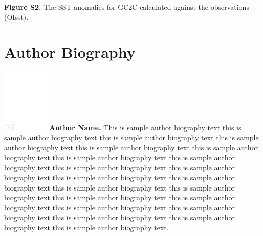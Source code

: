 \documentclass[AMA,STIX1COL]{WileyNJD-v2}
\begin{document}
\noindent
\textbf{Figure S2.}
{The SST anomalies for GC2C calculated against the observations (OIsst).}





%

\clearpage

\section*{Author Biography}

\begin{biography}{\includegraphics[width=66pt,height=86pt,draft]{empty}}{\textbf{Author Name.} This is sample author biography text this is sample author biography text this is sample author biography text this is sample author biography text this is sample author biography text this is sample author biography text this is sample author biography text this is sample author biography text this is sample author biography text this is sample author biography text this is sample author biography text this is sample author biography text this is sample author biography text this is sample author biography text this is sample author biography text this is sample author biography text this is sample author biography text this is sample author biography text this is sample author biography text this is sample author biography text this is sample author biography text.}
\end{biography}
\end{document}
